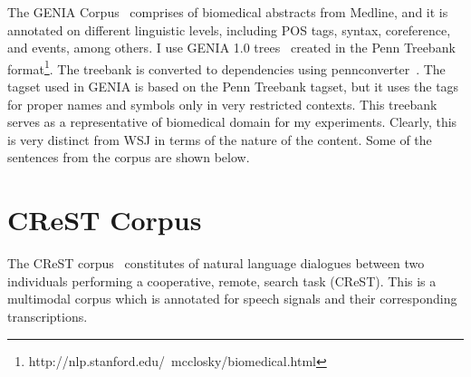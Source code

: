 The GENIA Corpus~\citep{tateisi:tsujii:04} comprises of biomedical abstracts from Medline, and it is annotated on different linguistic levels, including POS tags, syntax, coreference, and events, among others. I use GENIA 1.0 trees~\cite{Ohta:2002:GCA:1289189.1289260} created in the Penn Treebank format\footnote{http://nlp.stanford.edu/~mcclosky/biomedical.html}. The treebank is converted to dependencies using pennconverter~\cite{johansson2007a}. The tagset used in GENIA is based on the Penn Treebank tagset, but it uses the tags for proper names and symbols only in very restricted contexts. This treebank serves as a representative of biomedical domain for my experiments. Clearly, this is very distinct from WSJ in terms of the nature of the content. Some of the sentences from the corpus are shown below.~


\section{CReST Corpus}

The CReST corpus~\citep{eberhard2010indiana} constitutes of natural language dialogues between two individuals performing a cooperative, remote, search task (CReST). This is a multimodal corpus which is annotated for speech signals and their corresponding transcriptions.






